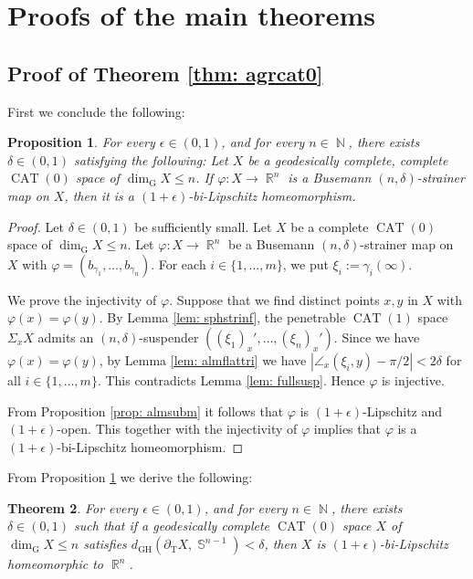 \documentclass[a4paper,12pt]{amsart}
\newcommand{\CAT}{\operatorname{CAT}}
\newcommand{\R}{\operatorname{\mathbb{R}}}
\newcommand{\N}{\operatorname{\mathbb{N}}}
\newcommand{\Sph}{\operatorname{\mathbb{S}}}
\newcommand{\GH}{\operatorname{\mathrm{GH}}}
\numberwithin{equation}{section}
\theoremstyle{plain}
\newtheorem{thm}{Theorem}[section]
\newtheorem{prop}[thm]{Proposition}
\theoremstyle{definition}
\theoremstyle{remark}
\begin{document}
\section{Proofs of the main theorems}

\subsection{Proof of Theorem \ref{thm: agrcat0}}

First we conclude the following:

\begin{prop}\label{prop: fullbstr}
For every $\epsilon \in (0,1)$,
and for every $n \in \N$,
there exists 
$\delta \in (0,1)$ satisfying the following:
Let $X$ be a geodesically complete,
complete $\CAT(0)$ space of $\dim_{\mathrm{G}}X \le n$.
If $\varphi \colon X \to \R^n$
is a Busemann $(n,\delta)$-strainer map on $X$,
then it is a $(1+\epsilon)$-bi-Lipschitz homeomorphism.
\end{prop}

\begin{proof}
Let $\delta \in (0,1)$ be sufficiently small.
Let $X$ be a complete $\CAT(0)$ space of $\dim_{\mathrm{G}}X \le n$.
Let $\varphi \colon X \to \R^n$
be a Busemann $(n,\delta)$-strainer map on $X$
with $\varphi = \left( b_{\gamma_1}, \dots, b_{\gamma_n} \right)$.
For each $i \in \{ 1, \dots, m \}$,
we put $\xi_i := \gamma_i(\infty)$.

We prove the injectivity of $\varphi$.
Suppose that
we find distinct points $x, y$ in $X$
with $\varphi(x) = \varphi(y)$.
By Lemma \ref{lem: sphstrinf},
the penetrable $\CAT(1)$ space $\Sigma_xX$
admits an $(n,\delta)$-suspender 
$\left( (\xi_1)_x', \dots, (\xi_n)_x' \right)$.
Since we have $\varphi(x) = \varphi(y)$,
by Lemma \ref{lem: almflattri} we have
$\left\vert \angle_{x}(\xi_i,y) - \pi/2 \right\vert < 2\delta$
for all $i \in \{ 1, \dots, m \}$.
This contradicts Lemma \ref{lem: fullsusp}.
Hence $\varphi$ is injective.

From Proposition \ref{prop: almsubm}
it follows that $\varphi$ is $(1+\epsilon)$-Lipschitz
and $(1+\epsilon)$-open.
This together with the injectivity of $\varphi$
implies that $\varphi$ is 
a $(1+\epsilon)$-bi-Lipschitz homeomorphism.
\end{proof}

From Proposition \ref{prop: fullbstr}
we derive the following:

\begin{thm}
\label{thm: agrcat0g}
For every $\epsilon \in (0,1)$,
and for every $n \in \N$,
there exists $\delta \in (0,1)$ such that
if a geodesically complete $\CAT(0)$ space $X$
of $\dim_{\mathrm{G}} X \le n$
satisfies
$d_{\GH} \left( \partial_{\mathrm{T}}X, \Sph^{n-1} \right) < \delta$,
then $X$ is $(1+\epsilon)$-bi-Lipschitz homeomorphic to $\R^n$.
\end{thm}
\end{document}
